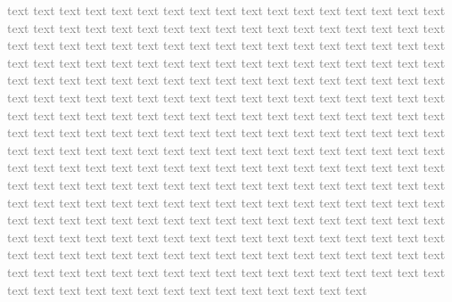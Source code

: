 \documentclass[sigconf]{acmart}
\begin{document}
\textcolor{gray}{
    text text text text text text text text text text text text text text text text text text text text text text text text text text text text text text text text text text text text text text text text text text text text text text text text text text text text text text text text text text text text text text text text text text text text text text text text text text text text text text text text text text text text text text text text text text text text text text text text text text text text text text text text text text text text text text text text text text text text text text text text text text text text text text text text text text text text text text text text text text text text text text text text text text text text text text text text text text text text text text text text text text text text text text text text text text text text text text text text text text text text text text text text text text text text text text text text text text text text text text text text text text text text text text text text text text text text text text text text text text text text text text text text text text text text text text text text text text text text text text text text text text text text text text text text text text text text text text text text text text text text text text text text text text text text text text text text text text text text text text text text text text text text text text 
}
\end{document}

